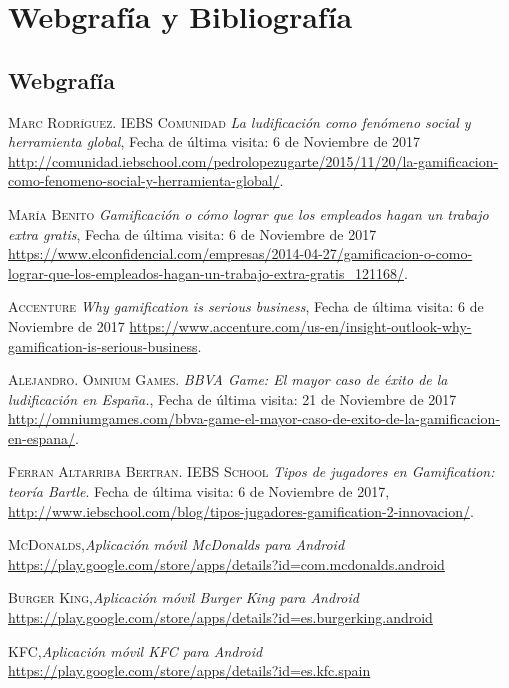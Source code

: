 \documentclass[twoside]{report}
\begin{document}
\chapter{Webgrafía y Bibliografía}
\begin{thebibliography}{a} 
\section{Webgrafía}

 \textsc{Marc Rodríguez. IEBS Comunidad} \textit{La ludificación como fenómeno social y herramienta global}, Fecha de última visita: 6 de Noviembre de 2017 \url{http://comunidad.iebschool.com/pedrolopezugarte/2015/11/20/la-gamificacion-como-fenomeno-social-y-herramienta-global/}.  

 \textsc{María Benito} \textit{Gamificación o cómo lograr que los empleados hagan un trabajo extra gratis}, Fecha de última visita: 6 de Noviembre de 2017 \url{https://www.elconfidencial.com/empresas/2014-04-27/gamificacion-o-como-lograr-que-los-empleados-hagan-un-trabajo-extra-gratis_121168/}. 

 \textsc{Accenture} \textit{Why gamification is serious business}, Fecha de última visita: 6 de Noviembre de 2017 \url{https://www.accenture.com/us-en/insight-outlook-why-gamification-is-serious-business}.  

 \textsc{Alejandro. Omnium Games.} \textit{BBVA Game: El mayor caso de éxito de la ludificación en España.}, Fecha de última visita: 21 de Noviembre de 2017 \url{http://omniumgames.com/bbva-game-el-mayor-caso-de-exito-de-la-gamificacion-en-espana/}.  

 \textsc{Ferran Altarriba Bertran. IEBS School} \textit{Tipos de jugadores en Gamification: teoría Bartle}. Fecha de última visita: 6 de Noviembre de 2017, \url{http://www.iebschool.com/blog/tipos-jugadores-gamification-2-innovacion/}.  

 \textsc{McDonalds},\textit{Aplicación móvil McDonalds para Android} \url{https://play.google.com/store/apps/details?id=com.mcdonalds.android}


 \textsc{Burger King},\textit{Aplicación móvil Burger King para Android} \url{https://play.google.com/store/apps/details?id=es.burgerking.android}

 \textsc{KFC},\textit{Aplicación móvil KFC para Android} \url{https://play.google.com/store/apps/details?id=es.kfc.spain}


\end{thebibliography}
\end{document}
